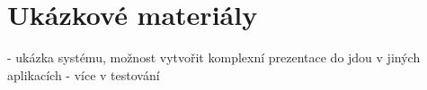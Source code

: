 







\section{Ukázkové materiály}\label{text:realizace/vytvoreneMaterialy}

- ukázka systému, možnost vytvořit komplexní prezentace do jdou v jiných aplikacích
- více v testování